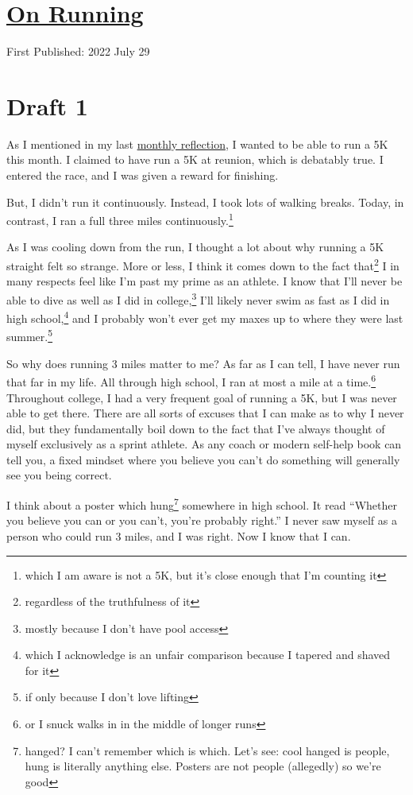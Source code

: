 \documentclass[12pt]{article}[titlepage]
\newcommand{\say}[1]{``#1''}
\newcommand{\1}{\={a}}
\newcommand{\2}{\={e}}
\newcommand{\3}{\={\i}}
\newcommand{\4}{\=o}
\newcommand{\5}{\=u}
\newcommand{\6}{\={A}}
\renewcommand{\,}{\textsuperscript{,}}
\begin{document}
\doublespacing
\section{\href{running.html}{On Running}}
First Published: 2022 July 29
\section{Draft 1}
As I mentioned in my last \href{reflection-june-2022.html}{monthly reflection}, I wanted to be able to run a 5K this month.
I claimed to have run a 5K at reunion, which is debatably true.
I entered the race, and I was given a reward for finishing.

But, I didn't run it continuously.
Instead, I took lots of walking breaks.
Today, in contrast, I ran a full three miles continuously.\footnote{which I am aware is not a 5K, but it's close enough that I'm counting it}

As I was cooling down from the run, I thought a lot about why running a 5K straight felt so strange.
More or less, I think it comes down to the fact that\footnote{regardless of the truthfulness of it} I in many respects feel like I'm past my prime as an athlete.
I know that I'll never be able to dive as well as I did in college,\footnote{mostly because I don't have pool access} I'll likely never swim as fast as I did in high school,\footnote{which I acknowledge is an unfair comparison because I tapered and shaved for it} and I probably won't ever get my maxes up to where they were last summer.\footnote{if only because I don't love lifting}

So why does running 3 miles matter to me?
As far as I can tell, I have never run that far in my life.
All through high school, I ran at most a mile at a time.\footnote{or I snuck walks in in the middle of longer runs}
Throughout college, I had a very frequent goal of running a 5K, but I was never able to get there.
There are all sorts of excuses that I can make as to why I never did, but they fundamentally boil down to the fact that I've always thought of myself exclusively as a sprint athlete.
As any coach or modern self-help book can tell you, a fixed mindset where you believe you can't do something will generally see you being correct.

I think about a poster which hung\footnote{hanged? I can't remember which is which. Let's see: cool hanged is people, hung is literally anything else. Posters are not people (allegedly) so we're good} somewhere in high school.
It read \say{Whether you believe you can or you can't, you're probably right.}
I never saw myself as a person who could run 3 miles, and I was right.
Now I know that I can.
\end{document}
